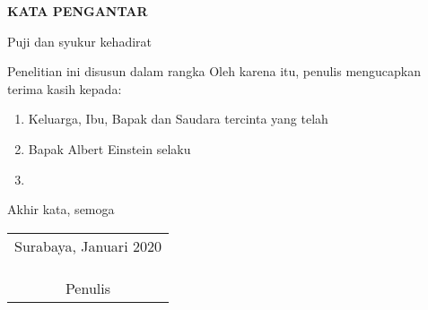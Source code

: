 \begin{center}
  \Large\textbf{KATA PENGANTAR}
\end{center}
\vspace{1ex}

\setlength{\parindent}{7ex} Puji dan syukur kehadirat \lipsum[1][1-5]
\vspace{0.5ex}

Penelitian ini disusun dalam rangka \lipsum[1][1-5]
Oleh karena itu, penulis mengucapkan terima kasih kepada:
\vspace{0.5ex}

\begin{enumerate}[nolistsep]
  \item Keluarga, Ibu, Bapak dan Saudara tercinta yang telah \lipsum[1][1]
  \vspace{0.5ex}
  \item Bapak Albert Einstein selaku \lipsum[1][1-2]
  \vspace{0.5ex}
  \item \lipsum[1][1-3]
  \vspace{0.5ex}
\end{enumerate}
\vspace{0.5ex}

Akhir kata, semoga \lipsum[1][1-5]
\vspace{2ex}

\begin{flushright}
  \begin{tabular}[b]{c}
    Surabaya, Januari 2020
    \\
    \\
    \\
    \\
    Penulis
  \end{tabular}
\end{flushright}
